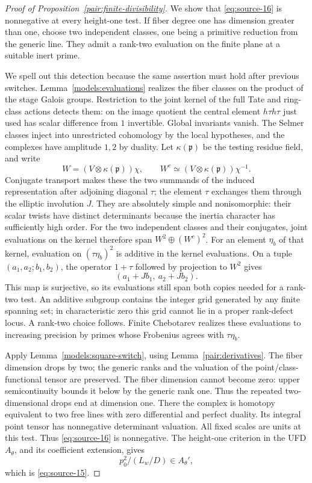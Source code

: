 \begin{proof}[Proof of Proposition~\ref{pair:finite-divisibility}]
We show that \eqref{eq:source-16} is nonnegative at every height-one
test.  If fiber degree one has dimension greater than one, choose
two independent classes, one being a primitive reduction from the
generic line.  They admit a rank-two evaluation on the finite
plane at a suitable inert prime.

We spell out this detection because the same assertion must hold
after previous switches.  Lemma~\ref{models:evaluations}
realizes the fiber classes on the product
of the stage Galois groups.  Restriction to the joint kernel of
the full Tate and ring-class actions detects them: on the image
quotient the central element \(h\tau h\tau\) just used has scalar
difference from \(1\) invertible.  Global invariants vanish.
The Selmer classes inject into unrestricted cohomology by the
local hypotheses, and the complexes have amplitude \(1,2\) by
duality.  Let \(\kappa(\mathfrak p)\) be the testing residue field,
and write
\[
 W=(V\otimes\kappa(\mathfrak p))\chi,\qquad
 W^c\simeq(V\otimes\kappa(\mathfrak p))\chi^{-1}.
\]
Conjugate transport makes these the two summands of the induced
representation after adjoining diagonal \(\tau\); the element
\(\tau\) exchanges them through the elliptic involution \(J\).
They are absolutely simple and nonisomorphic: their scalar
twists have distinct determinants because the inertia character
has sufficiently high order.  For the two independent classes
and their conjugates, joint evaluations on the kernel therefore
span \(W^2\oplus(W^c)^2\).
For an element \(\eta_b\) of that kernel, evaluation on
\((\tau\eta_b)^2\) is additive in the kernel evaluations.
On a tuple \((a_1,a_2;b_1,b_2)\), the operator \(1+\tau\)
followed by projection to \(W^2\) gives
\[
 (a_1+Jb_1,\ a_2+Jb_2).
\]
This map is surjective, so its evaluations still span both copies
needed for a rank-two test.
An additive subgroup contains the integer grid generated by any
finite spanning set; in characteristic zero this grid cannot lie
in a proper rank-defect locus.  A rank-two choice follows.
Finite Chebotarev realizes these evaluations to increasing
precision by primes whose Frobenius agrees with
\(\tau\eta_b\).

Apply Lemma~\ref{models:square-switch}, using
Lemma~\ref{pair:derivatives}.  The fiber dimension drops by two;
the generic ranks and the valuation of the point/class-functional
tensor are preserved.  The fiber dimension cannot become zero:
upper semicontinuity bounds it below by the generic rank one.
Thus the repeated two-dimensional drops end at dimension one.
There the complex is homotopy equivalent to two free lines with
zero differential and perfect duality.  Its integral point tensor
has nonnegative determinant valuation.  All fixed scales are
units at this test.  Thus \eqref{eq:source-16} is nonnegative.
The height-one criterion in the UFD \(A_\theta\), and its
coefficient extension, gives
\[
 p_0^2/(L_w/D)\in A_\theta',
\]
which is \eqref{eq:source-15}.


\end{proof}
